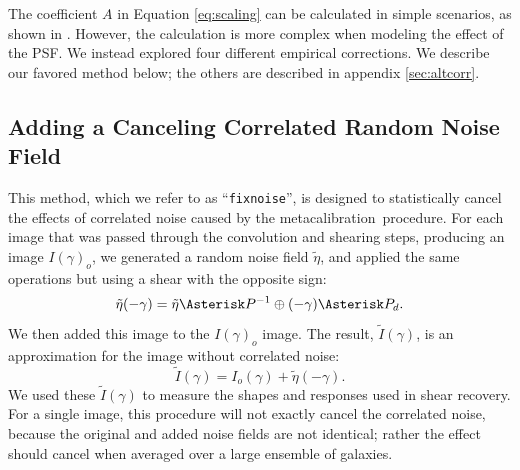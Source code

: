 \documentclass[usegraphicx,usenatbib]{mn2e}
\newcommand{\mcal}{metacalibration}
\newcommand{\mcalR}{$R$}
\newcommand{\fixnoise}{\texttt{fixnoise}}
\begin{document}
The coefficient $A$ in Equation \ref{eq:scaling} can be calculated in simple
scenarios, as shown in \cite{HirataCorrNoise}.  However, the calculation is
more complex when modeling the effect of the PSF.  We instead explored four
different empirical corrections.  We describe our favored method
below; the others are described in appendix \ref{sec:altcorr}.

\subsection{Adding a Canceling Correlated Random Noise Field} \label{sec:fixnoise}

This method, which we refer to as ``\fixnoise'', is designed to statistically
cancel the effects of correlated noise caused by the \mcal\ procedure.  For each
image that was passed through the convolution and shearing steps, producing
an image $I(\gamma)_o$, we generated a random noise field
$\tilde{\eta}$, and applied the same operations but using a shear with
the opposite sign:
\begin{equation}
    \tilde{\eta}(-\gamma) = \tilde{\eta} \Asterisk P^{-1} \oplus (-\gamma) \Asterisk P_{d}.
\end{equation}
We then added this image to the $I(\gamma)_o$ image.
The result, $\tilde{I}(\gamma)$, is an approximation for the image
without correlated noise:
\begin{equation}
    \tilde{I}(\gamma) = I_o(\gamma) + \tilde{\eta}(-\gamma).
\end{equation}
We used these $\tilde{I}(\gamma)$ to measure the shapes and responses used in
shear recovery.  For a single image, this procedure will not exactly cancel the
correlated noise, because the original and added noise fields are not
identical; rather the effect should cancel when averaged over a large ensemble
of galaxies.
\end{document}
